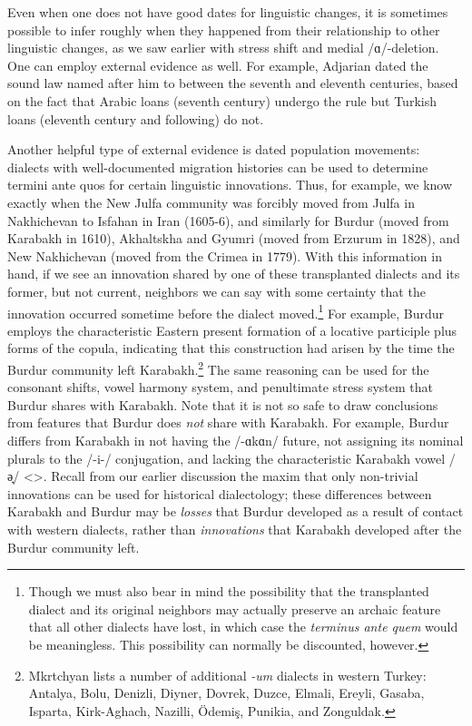 \documentclass[output=paper]{langscibook}
\begin{document}
Even when one does not have good dates for linguistic changes, it is sometimes possible to infer roughly when they happened from their relationship to other linguistic changes, as we saw earlier with stress shift and medial /ɑ/-deletion. One can employ external evidence as well. For example, Adjarian \citep{Adjarian-1952-Liakatar1AdjNumeral}   dated the sound law named after him to between the seventh and eleventh centuries, based on the fact that Arabic loans (seventh century) undergo the rule but Turkish loans (eleventh century and following) do not.

Another helpful type of external evidence is dated population movements: dialects with well-documented migration histories can be used to determine termini ante quos for certain linguistic innovations. Thus, for example, we know exactly when the New Julfa community was forcibly moved from Julfa in Nakhichevan to Isfahan in Iran (1605-6), and similarly for Burdur (moved from Karabakh in 1610), Akhaltskha  and Gyumri (moved from Erzurum in 1828), and New Nakhichevan (moved from the Crimea in 1779). With this information in hand, if we see an innovation shared by one of these transplanted dialects and its former, but not current, neighbors we can say with some certainty that the innovation occurred sometime before the dialect moved.\footnote{ Though we must also bear in mind the possibility that the transplanted dialect and its original neighbors may actually preserve an archaic feature that all other dialects have lost, in which case the \textit{terminus ante quem} would be meaningless. This possibility can normally be discounted, however.} For example, Burdur employs the characteristic Eastern present formation of a locative participle plus forms of the copula, indicating that this construction had arisen by the time the Burdur community left Karabakh.\footnote{Mkrtchyan \citep[21]{Mkrtchyan-1971-BurdurDialect}  lists a number of additional \textit{-um} dialects in western Turkey: Antalya, Bolu, Denizli, Diyner, Dovrek, Duzce, Elmali, Ereyli, Gasaba, Isparta, Kirk-Aghach, Nazilli, Ödemiş, Punikia, and Zonguldak.} The same reasoning can be used for the consonant shifts, vowel harmony system, and penultimate stress system that Burdur shares with Karabakh. Note that it is not so safe to draw conclusions from features that Burdur does \textit{not} share with Karabakh. For example, Burdur differs from Karabakh in not having the /-ɑkɑn/ future, not assigning its nominal plurals to the /-i-/ conjugation, and lacking the characteristic Karabakh vowel /ə̟/ <>.  Recall from our earlier discussion the maxim that only non-trivial innovations can be used for historical dialectology; these differences between Karabakh and Burdur may be \textit{losses} that Burdur developed as a result of contact with western dialects, rather than \textit{innovations} that Karabakh developed after the Burdur community left.
\end{document}
